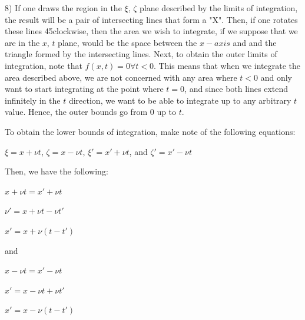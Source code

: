 \documentclass[executivepaper]{article}
\begin{document}
\begin{flushleft}

8) If one draws the region in the $\xi$, $\zeta$ plane described by the limits of integration, the result will be a pair of intersecting lines that form a "X". Then, if one rotates these lines 45\degree clockwise, then the area we wish to integrate, if we suppose that we are in the $x$, $t$ plane, would be the space between the $x-axis$ and and the triangle formed by the intersecting lines. Next, to obtain the outer limits of integration, note that $f(x,t)=0 \forall t < 0$. This means that when we integrate the area described above, we are not concerned with any area where $t < 0$ and only want to start integrating at the point where $t=0$, and since both lines extend infinitely in the $t$ direction, we want to be able to integrate up to any arbitrary $t$ value. Hence, the outer bounds go from $0$ up to $t$.

\vspace{3mm}

To obtain the lower bounds of integration, make note of the following equations:

\begin{center}

$\xi=x+\nu t$, $\zeta=x-\nu t$, $\xi'=x'+\nu t$, and $\zeta'=x'-\nu t$

\vspace{3mm}

Then, we have the following:

$x+\nu t=x'+\nu t$

\vspace{1mm}

$\nu'=x+\nu t-\nu t'$

\vspace{1mm}

$x'=x+\nu(t-t')$

\vspace{3mm}

and

\vspace{3mm}

$x-\nu t=x'-\nu t$

\vspace{1mm}

$x'=x-\nu t+\nu t'$

\vspace{1mm}

$x'=x-\nu(t-t')$

\vspace{4mm}


\end{center}
\end{flushleft}
\end{document}
